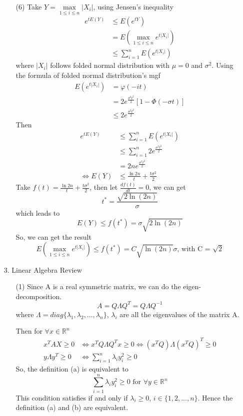 \documentclass[a4paper,12pt]{article}
\begin{document}
\begin{enumerate}
\begin{itemize}
\clearpage
\item[(6)]
Take $Y = \max \limits_{1 \le i \le n} |X_i|$, using Jensen’s inequality
\begin{align*}
e^{tE(Y)} &\le E(e^{tY}) \\
		  &= E \left ( \max \limits_{1 \le i \le n} e^{t|X_i|}\right ) \\
		  &\le \sum_{i=1}^n E \left (e^{t|X_i|}\right ) 
\end{align*}
where $|X_i|$ follows folded normal distribution with $\mu=0$ and $\sigma^2 $. Using the formula of folded normal distribution's mgf
\begin{align*}
E \left (e^{t|X_i|} \right ) &= \varphi (-it) \\
					     &= 2e^{\frac{\sigma^2 t^2}{2}} \left [ 1 - \Phi(-\sigma t)\right ] \\
					     &\le 2e^{\frac{\sigma^2 t^2}{2}}
\end{align*}
Then 
\begin{align*}
e^{tE(Y)} &\le \sum_{i=1}^n E \left (e^{t|X_i|}\right ) \\
		  &\le  \sum_{i=1}^n 2e^{\frac{\sigma^2 t^2}{2}} \\
		  &= 2n e^{\frac{\sigma^2 t^2}{2}} \\
\Longleftrightarrow E(Y) &\le \frac{\ln 2n}{t} + \frac{t \sigma^2}{2}
\end{align*}
Take $f(t) = \frac{\ln 2n}{t} + \frac{t \sigma^2}{2}$, then let $\frac{d f(t)}{dt} = 0$, we can get
$$
t^* = \frac{\sqrt{2 \ln (2n)}}{\sigma}
$$
which leads to
$$
E(Y) \le f(t^*) = \sigma \sqrt{2 \ln (2n)}
$$
So, we can get the result 
$$
E \left ( \max \limits_{1 \le i \le n} e^{t|X_i|}\right ) \le f(t^*) =  C \sqrt{\ln (2n)}\sigma \text{,  with C = } \sqrt{2}
$$
\end{itemize}

\clearpage

\item[3.] Linear Algebra Review\\
\begin{itemize} 
\item[(1)]
Since A is a real symmetric matrix, we can do the eigen-decomposition. 
$$
A = Q \Lambda Q^T = Q \Lambda Q^{-1}
$$
where $\Lambda = diag \{ \lambda_1, \lambda_2,..., \lambda_n \}$, $\lambda_i$ are all the eigenvalues of the matrix A. 

Then for $\forall x \in \mathbb{R}^n$
\begin{align*}
x^T A X \ge 0 & \Longleftrightarrow x^T Q \Lambda Q^T x \ge 0 \Longleftrightarrow (x^T Q) \Lambda(x^T Q)^T \ge 0\\
y \Lambda y^T \ge 0 & \Longleftrightarrow \sum_{i=1}^n \lambda_i y_i^2 \ge 0
\end{align*}
So, the definition (a) is equivalent to 
$$
\sum_{i=1}^n \lambda_i y_i^2 \ge 0 \text{ for } \forall y \in  \mathbb{R}^n
$$
This  condition satisfies if and only if $\lambda_i \ge 0$, $i \in \{1,2,...,n\}$. Hence the definition (a) and (b) are equivalent.\\


\end{itemize}
\end{enumerate}
\end{document}
